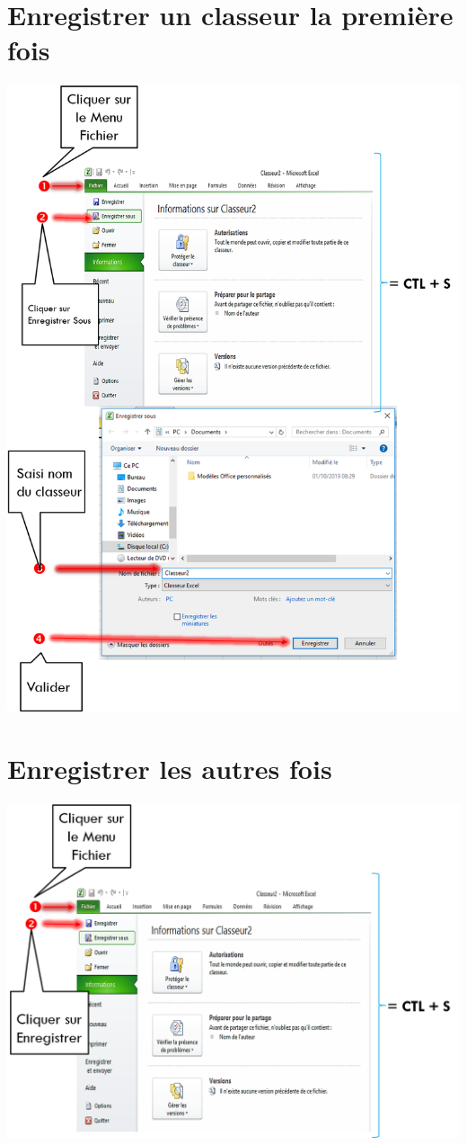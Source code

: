 \section{Enregistrer un classeur la première fois}
\begin{center} 
	\includegraphics[scale=0.2,width=\linewidth]{img/sauve_as_classeur} 
\end{center}

\section{Enregistrer les autres fois}
\begin{center} 
	\includegraphics[scale=0.2,width=0.8\linewidth]{img/sauve_classeur} 
\end{center}
